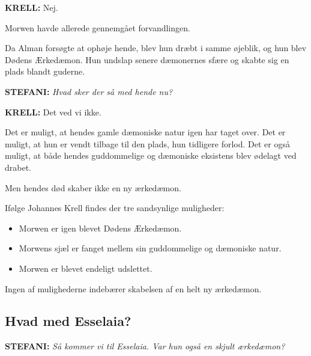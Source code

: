 \documentclass[a4paper,12pt]{memoir}
\begin{document}
\noindent
{\sffamily\bfseries KRELL:}
Nej.

Morwen havde allerede gennemgået forvandlingen.

Da Alman forsøgte at ophøje hende, blev hun dræbt i samme
øjeblik, og hun blev Dødens Ærkedæmon. Hun undslap senere
dæmonernes sfære og skabte sig en plads blandt guderne.

\par\medskip

\noindent
{\sffamily\bfseries\color{Maroon!90!black} STEFANI:}
\textit{Hvad sker der så med hende nu?}

\par\smallskip

\noindent
{\sffamily\bfseries KRELL:}
Det ved vi ikke.

Det er muligt, at hendes gamle dæmoniske natur igen har
taget over. Det er muligt, at hun er vendt tilbage til den plads,
hun tidligere forlod. Det er også muligt, at både hendes
guddommelige og dæmoniske eksistens blev ødelagt ved drabet.

Men hendes død skaber ikke en ny ærkedæmon.

\begin{tcolorbox}[
  enhanced,
  colback=black!5,
  colframe=black!70,
  boxrule=0.8pt,
  sharp corners,
  borderline north={2pt}{0pt}{black},
  title={\sffamily\bfseries MORWENS MULIGE SKÆBNE},
  colbacktitle=black!85,
  coltitle=white,
  fontupper=\small
]
Ifølge Johannes Krell findes der tre sandsynlige muligheder:

\begin{itemize}
  \setlength{\itemsep}{0.3em}
  \item Morwen er igen blevet Dødens Ærkedæmon.
  \item Morwens sjæl er fanget mellem sin guddommelige og
        dæmoniske natur.
  \item Morwen er blevet endeligt udslettet.
\end{itemize}

Ingen af mulighederne indebærer skabelsen af en helt ny
ærkedæmon.
\end{tcolorbox}

\subsection*{Hvad med Esselaia?}

\noindent
{\sffamily\bfseries\color{Maroon!90!black} STEFANI:}
\textit{Så kommer vi til Esselaia. Var hun også en skjult
ærkedæmon?}
\end{document}
